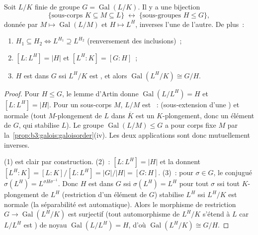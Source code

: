 \begin{theorem}\label{thm:b3:galois:fundamental}
Soit $L/K$  finie de groupe $G = \operatorname{Gal}(L/K)$.
Il y a une bijection
\[
\{\text{sous-corps } K \subseteq M \subseteq L\}
\;\longleftrightarrow\;
\{\text{sous-groupes } H \leq G\},
\]
donnée par $M \mapsto \operatorname{Gal}(L/M)$ et $H \mapsto
L^H$, inverses l'une de l'autre. De plus~:
\begin{enumerate}
  \item $H_1 \subseteq H_2 \iff L^{H_1} \supseteq L^{H_2}$
        (renversement des inclusions)~;
  \item $[L:L^H] = |H|$ et $[L^H:K] = [G:H]$~;
  \item $H$ est  dans $G$ ssi $L^H/K$ est , et
        alors $\operatorname{Gal}(L^H/K) \cong G/H$.
\end{enumerate}
\end{theorem}

\begin{proof}
Pour $H \leq G$, le lemme d'Artin donne $\operatorname{Gal}(L/L^H)
= H$ et $[L:L^H] = |H|$. Pour un sous-corps $M$, $L/M$ est
~:  (sous-extension d'une ) et
normale (tout $M$-plongement de $L$ dans $\overline K$ est un
$K$-plongement, donc un élément de $G$, qui stabilise $L$). Le
groupe $\operatorname{Gal}(L/M) \leq G$ a pour corps fixe $M$
par la~\cref{prop:b3:galois:galoisorder}(iv). Les deux
applications sont donc mutuellement inverses.

(1) est clair par construction. (2)~: $[L:L^H] = |H|$ et la
 donnent $[L^H:K] = [L:K]/[L:L^H] = |G|/|H| =
[G:H]$. (3)~: pour $\sigma \in G$, le conjugué $\sigma(L^H) =
L^{\sigma H\sigma^{-1}}$. Donc $H$ est  dans $G$ ssi
$\sigma(L^H) = L^H$ pour tout $\sigma$ ssi tout $K$-plongement
de $L^H$ (restriction d'un élément de $G$) stabilise $L^H$ ssi
$L^H/K$ est normale (la séparabilité est automatique). Alors
le morphisme de restriction $G \to \operatorname{Gal}(L^H/K)$
est surjectif (tout automorphisme de $L^H/K$ s'étend à $L$ car
$L/L^H$ est ) de noyau $\operatorname{Gal}(L/L^H) =
H$, d'où $\operatorname{Gal}(L^H/K) \cong G/H$.
\end{proof}


